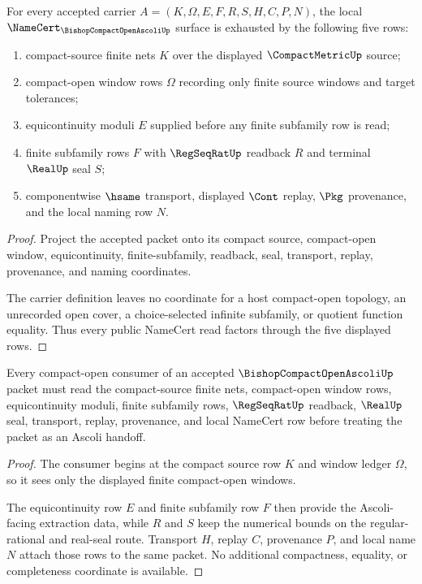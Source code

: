 \begin{theorem}
\label{thm:bishop-compact-open-ascoli-namecert-obligations}
For every accepted carrier $A=(K,\Omega,E,F,R,S,H,C,P,N)$, the local $\NameCert_{\BishopCompactOpenAscoliUp}$ surface is exhausted by the following five rows:
\begin{enumerate}
\item compact-source finite nets $K$ over the displayed $\CompactMetricUp$ source;
\item compact-open window rows $\Omega$ recording only finite source windows and target tolerances;
\item equicontinuity moduli $E$ supplied before any finite subfamily row is read;
\item finite subfamily rows $F$ with $\RegSeqRatUp$ readback $R$ and terminal $\RealUp$ seal $S$;
\item componentwise $\hsame$ transport, displayed $\Cont$ replay, $\Pkg$ provenance, and the local naming row $N$.
\end{enumerate}
\end{theorem}
\begin{proof}
Project the accepted packet onto its compact source, compact-open window, equicontinuity, finite-subfamily, readback, seal, transport, replay, provenance, and naming coordinates.

The carrier definition leaves no coordinate for a host compact-open topology, an unrecorded open cover, a choice-selected infinite subfamily, or quotient function equality. Thus every public NameCert read factors through the five displayed rows.
\end{proof}

\begin{theorem}
\label{thm:bishop-compact-open-ascoli-compact-open-route}
Every compact-open consumer of an accepted $\BishopCompactOpenAscoliUp$ packet must read the compact-source finite nets, compact-open window rows, equicontinuity moduli, finite subfamily rows, $\RegSeqRatUp$ readback, $\RealUp$ seal, transport, replay, provenance, and local NameCert row before treating the packet as an Ascoli handoff.
\end{theorem}
\begin{proof}
The consumer begins at the compact source row $K$ and window ledger $\Omega$, so it sees only the displayed finite compact-open windows.

The equicontinuity row $E$ and finite subfamily row $F$ then provide the Ascoli-facing extraction data, while $R$ and $S$ keep the numerical bounds on the regular-rational and real-seal route. Transport $H$, replay $C$, provenance $P$, and local name $N$ attach those rows to the same packet. No additional compactness, equality, or completeness coordinate is available.
\end{proof}

